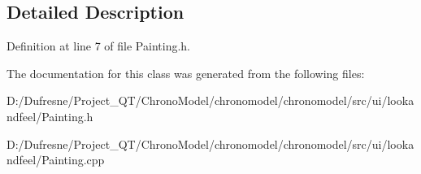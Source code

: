 \subsection{Detailed Description}


Definition at line 7 of file Painting.\-h.



The documentation for this class was generated from the following files\-:\begin{DoxyCompactItemize}
\item 
D\-:/\-Dufresne/\-Project\-\_\-\-Q\-T/\-Chrono\-Model/chronomodel/chronomodel/src/ui/lookandfeel/Painting.\-h\item 
D\-:/\-Dufresne/\-Project\-\_\-\-Q\-T/\-Chrono\-Model/chronomodel/chronomodel/src/ui/lookandfeel/Painting.\-cpp\end{DoxyCompactItemize}
